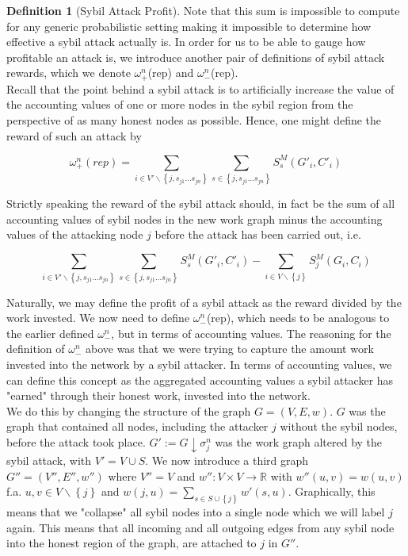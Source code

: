 \documentclass[11pt,a4paper]{report}
\theoremstyle{definition}
\newtheorem{definition}{Definition}[section]
\theoremstyle{theorem}
\theoremstyle{proposition}
\theoremstyle{corollary}
\theoremstyle{lemma}
\theoremstyle{example}
\theoremstyle{remark}
\begin{document}
\begin{definition}[Sybil Attack Profit]
\noindent{}Note that this sum is impossible to compute for any generic probabilistic setting making it impossible to determine how effective a sybil attack actually is. In order for us to be able to gauge how profitable an attack is, we introduce another pair of definitions of sybil attack rewards, which we denote $\omega_{+}^{n}$(rep) and $\omega_{-}^{n}$(rep). \vspace{1em}\\ 

\noindent{}Recall that the point behind a sybil attack is to artificially increase the value of the accounting values of one or more nodes in the sybil region from the perspective of as many honest nodes as possible. Hence, one might define the reward of such an attack by 

\[
\omega_{+}^{n}(\textit{rep}) = \sum\limits_{i\in{}V'\backslash\left\lbrace{}j,s_{j1}\ldots{}s_{jn}\right\rbrace}\sum\limits_{s\in\left\lbrace{}j,s_{j1}\ldots{}s_{jn}\right\rbrace}S^M_s(G'_i,C'_i)
\]

\noindent{}Strictly speaking the reward of the sybil attack should, in fact be the sum of all accounting values of sybil nodes in the new work graph minus the accounting values of the attacking node $j$ before the attack has been carried out, i.e.

\[
\sum\limits_{i\in{}V'\backslash\left\lbrace{}j,s_{j1}\ldots{}s_{jn}\right\rbrace}\sum\limits_{s\in\left\lbrace{}j,s_{j1}\ldots{}s_{jn}\right\rbrace}S^M_s(G'_i,C'_i) - \sum\limits_{i\in{}V\backslash\left\lbrace{}j\right\rbrace}S^M_j(G_i,C_i)
\]

\noindent{}Naturally, we may define the profit of a sybil attack as the reward divided by the work invested. We now need to define $\omega^{n}_{-}$(rep), which needs to be analogous to the earlier defined $\omega_{-}^{n}$, but in terms of accounting values. The reasoning for the definition of $\omega_{-}^{n}$ above was that we were trying to capture the amount work invested into the network by a sybil attacker. In terms of accounting values, we can define this concept as the aggregated accounting values a sybil attacker has "earned" through their honest work, invested into the network. \vspace{1em}\\

\noindent{}We do this by changing the structure of the graph $G=(V,E,w)$. $G$ was the graph that contained all nodes, including the attacker $j$ without the sybil nodes, before the attack took place. $G':=G\downarrow\sigma^n_j$ was the work graph altered by the sybil attack, with $V'=V\cup{}S$. We now introduce a third graph $G''=(V'',E'',w'')$ where $V''=V$ and $w'':V\times{}V\rightarrow\mathbb{R}$ with $w''(u,v)=w(u,v)$ f.a. $u,v\in{}V\backslash\left\lbrace{}j\right\rbrace$ and $w(j,u)=\sum\limits_{s\in{}S\cup\left\lbrace{}j\right\rbrace}w'(s,u)$. Graphically, this means that we "collapse" all sybil nodes into a single node which we will label $j$ again. This means that all incoming and all outgoing edges from any sybil node into the honest region of the graph, are attached to $j$ in $G''$. \vspace{1em}\\


\end{definition}
\end{document}
